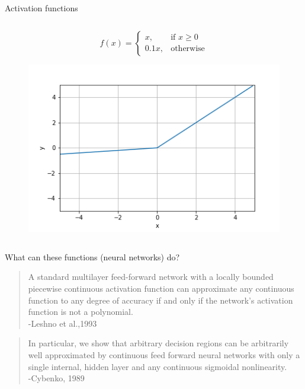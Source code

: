\begin{frame}{Activation functions}
\begin{columns}[T]
\begin{column}{.5\textwidth}
			\tiny{
				\[
				f(x)= 
				\begin{cases}
					x,& \text{if } x\geq 0\\
					0.1x,              & \text{otherwise}
				\end{cases}
				\]
			}
			\begin{figure}
				\includegraphics[width=.6\textwidth, center]{figuras/leaky_relu.png}	
			\end{figure}
		\end{column}
	\end{columns}
\end{frame}

\begin{frame}{What can these functions (neural networks) do?}
\begin{quote}
	{\small
		A standard multilayer feed-forward network with a locally bounded 
		piecewise continuous activation function can approximate any continuous 
		function to any degree of accuracy if and only if the network's activation 
		function is not a polynomial.\\
		-Leshno et al.,1993
	}
\end{quote}
\begin{quote}
	{\small 
		In particular, we show that arbitrary decision regions can
		be arbitrarily well approximated by continuous feed forward neural networks with
		only a single internal, hidden layer and any continuous sigmoidal nonlinearity.\\
		-Cybenko, 1989 
	}
\end{quote}
\end{frame}


